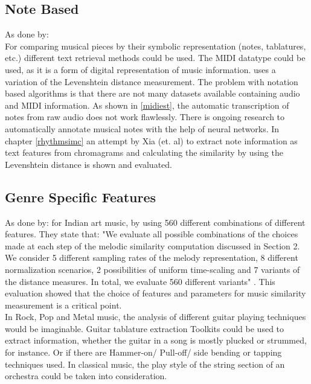 \subsection{Note Based}

As done by: \cite{midi1}\\
For comparing musical pieces by their symbolic representation (notes, tablatures, etc.) different text retrieval methods could be used. The MIDI datatype could be used, as it is a form of digital representation of music information. 
\cite{midi1} uses a variation of the Levenshtein distance measurement. 
The problem with notation based algorithms is that there are not many datasets available containing audio and MIDI information.
As shown in \ref{midiest}, the automatic transcription of notes from raw audio does not work flawlessly. 
There is ongoing research to automatically annotate musical notes with the help of neural networks.\cite{crepe1}
In chapter \ref{rhythmsimc} an attempt by Xia (et. al) \cite{chroma4} to extract note information as text features from chromagrams and calculating the similarity by using the Levenshtein distance is shown and evaluated.

\subsection{Genre Specific Features}

As done by: \cite{mussim1} for Indian art music, by using 560 different combinations of different features. They state that: "We evaluate all possible combinations of the choices made at each step of the melodic similarity computation discussed in Section 2.  We consider 5 different sampling rates of the melody representation, 8 different normalization scenarios, 2 possibilities of uniform time-scaling and 7 variants of the distance measures.  In total, we evaluate 560 different variants" \cite[p. 3]{mussim1}. This evaluation showed that the choice of features and parameters for music similarity measurement is a critical point.\\
In Rock, Pop and Metal music, the analysis of different guitar playing techniques would be imaginable. Guitar tablature extraction \cite{guitext1} Toolkits could be used to extract information, whether the guitar in a song is mostly plucked or strummed, for instance. Or if there are Hammer-on/ Pull-off/ side bending or tapping techniques used.
In classical music, the play style of the string section of an orchestra could be taken into consideration. 

